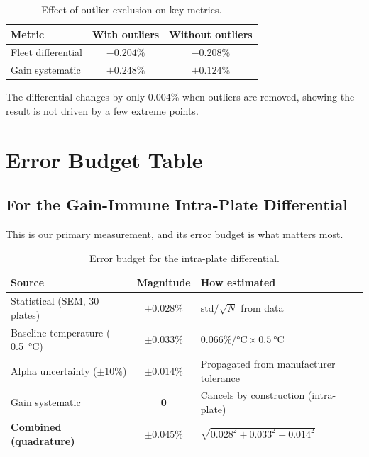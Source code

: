 \documentclass[11pt,letterpaper]{article}
\begin{document}
\begin{table}[htbp]
\centering
\caption{Effect of outlier exclusion on key metrics.}
\label{tab:outlier-effect}
\begin{tabular}{@{}lcc@{}}
\toprule
Metric & With outliers & Without outliers \\
\midrule
Fleet differential  & $-0.204\%$    & $-0.208\%$    \\
Gain systematic     & $\pm 0.248\%$ & $\pm 0.124\%$ \\
\bottomrule
\end{tabular}
\end{table}

The differential changes by only 0.004\% when outliers are removed, showing the
result is not driven by a few extreme points.


\section{Error Budget Table}
\label{sec:errorbudget}

\subsection{For the Gain-Immune Intra-Plate Differential}

This is our primary measurement, and its error budget is what matters most.

\begin{table}[htbp]
\centering
\caption{Error budget for the intra-plate differential.}
\label{tab:errbudget-diff}
\begin{tabular}{@{}lcp{6.5cm}@{}}
\toprule
Source & Magnitude & How estimated \\
\midrule
Statistical (SEM, 30 plates)              & $\pm 0.028\%$ & $\mathrm{std}/\sqrt{N}$ from data \\
Baseline temperature ($\pm$\SI{0.5}{\degreeCelsius}) & $\pm 0.033\%$ & $0.066\%/\si{\degreeCelsius} \times \SI{0.5}{\degreeCelsius}$ \\
Alpha uncertainty ($\pm 10\%$)            & $\pm 0.014\%$ & Propagated from manufacturer tolerance \\
Gain systematic                           & \textbf{0}    & Cancels by construction (intra-plate) \\
\midrule
\textbf{Combined (quadrature)}            & $\boldsymbol{\pm 0.045\%}$ & $\sqrt{0.028^2 + 0.033^2 + 0.014^2}$ \\
\bottomrule
\end{tabular}
\end{table}
\end{document}
